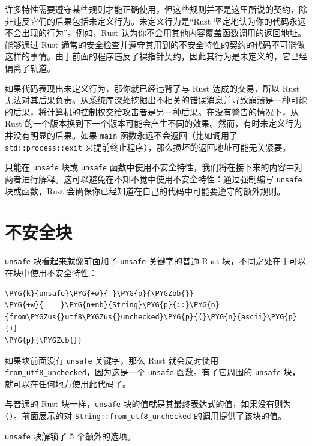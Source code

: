 许多特性需要遵守某些规则才能正确使用，但这些规则并不是这里所说的契约，除非违反它们的后果包括未定义行为。未定义行为是“Rust 坚定地认为你的代码永远不会出现的行为”。例如，Rust 认为你不会用其他内容覆盖函数调用的返回地址。能够通过 Rust 通常的安全检查并遵守其用到的不安全特性的契约的代码不可能做这样的事情。由于前面的程序违反了裸指针契约，因此其行为是未定义的，它已经偏离了轨道。

如果代码表现出未定义行为，那你就已经违背了与 Rust 达成的交易，所以 Rust 无法对其后果负责。从系统库深处挖掘出不相关的错误消息并导致崩溃是一种可能的后果，将计算机的控制权交给攻击者是另一种后果。在没有警告的情况下，从 Rust 的一个版本换到下一个版本可能会产生不同的效果。然而，有时未定义行为并没有明显的后果。如果 \texttt{main} 函数永远不会返回（比如调用了 \texttt{std::process::exit} 来提前终止程序），那么损坏的返回地址可能无关紧要。

只能在 \texttt{unsafe} 块或 \texttt{unsafe} 函数中使用不安全特性，我们将在接下来的内容中对两者进行解释。这可以避免在不知不觉中使用不安全特性：通过强制编写 \texttt{unsafe} 块或函数，Rust 会确保你已经知道在自己的代码中可能要遵守的额外规则。

\section{不安全块}

\texttt{unsafe} 块看起来就像前面加了 \texttt{unsafe} 关键字的普通 Rust 块，不同之处在于可以在块中使用不安全特性：

\begin{Verbatim}[commandchars=\\\{\},breaklines=true,breakanywhere=true,fontsize=\codefont,xleftmargin=17bp]
\PYG{k}{unsafe}\PYG{+w}{ }\PYG{p}{\PYGZob{}}
\PYG{+w}{    }\PYG{n+nb}{String}\PYG{p}{::}\PYG{n}{from\PYGZus{}utf8\PYGZus{}unchecked}\PYG{p}{(}\PYG{n}{ascii}\PYG{p}{)}
\PYG{p}{\PYGZcb{}}
\end{Verbatim}

如果块前面没有 \texttt{unsafe} 关键字，那么 Rust 就会反对使用 \texttt{from\_utf8\_unchecked}，因为这是一个 \texttt{unsafe} 函数。有了它周围的 \texttt{unsafe} 块，就可以在任何地方使用此代码了。

与普通的 Rust 块一样，\texttt{unsafe} 块的值就是其最终表达式的值，如果没有则为 \texttt{()}。前面展示的对 \texttt{String::from\_utf8\_unchecked} 的调用提供了该块的值。

\texttt{unsafe} 块解锁了 5 个额外的选项。

